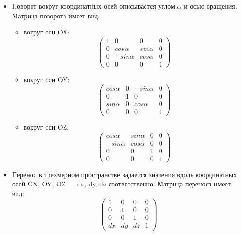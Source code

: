\begin{itemize}
	\item Поворот вокруг координатных осей описывается углом $\alpha$ и осью вращения.
	Матрица поворота имеет вид:
	\begin{itemize}
		\item вокруг оси OX:
		\begin{equation}
			\begin{pmatrix}
				1 	& 0 		  & 0 	       & 0 \\
				0 	& cos \alpha  & sin \alpha & 0 \\
				0	& -sin \alpha & cos \alpha & 0 \\
				0 	& 0 		  & 0          & 1
			\end{pmatrix}
		\end{equation}
		\item вокруг оси OY:
			\begin{equation}
			\begin{pmatrix}
				cos \alpha 	& 0 & -sin \alpha & 0 \\
				0 			& 1 & 0 		  & 0 \\
				sin \alpha	& 0 & cos \alpha  & 0 \\
				0 			& 0 & 0           & 1
			\end{pmatrix}
		\end{equation}
		\item вокруг оси OZ:
		\begin{equation}
			\begin{pmatrix}
				cos \alpha 	 & sin \alpha & 0 & 0 \\
				-sin \alpha  & cos \alpha & 0 & 0 \\
				0	 		 & 0		  & 1 & 0 \\
				0 			 & 0 		  & 0 & 1
			\end{pmatrix}
		\end{equation}
	\end{itemize}
	\item Перенос в трехмерном пространстве задается значения вдоль координатных осей OX, OY, OZ --- dx, dy, dz соответственно.
	Матрица переноса имеет вид:
	\begin{equation}
		\begin{pmatrix}
			1  & 0  & 0  & 0 \\
			0  & 1  & 0  & 0 \\
			0  & 0  & 1  & 0 \\
			dx & dy	& dz & 1
		\end{pmatrix}
	\end{equation}
\end{itemize}

